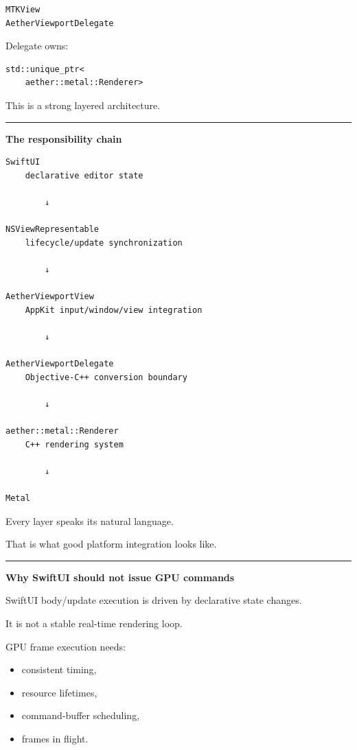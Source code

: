 \begin{verbatim}
MTKView
AetherViewportDelegate
\end{verbatim}

Delegate owns:

\begin{verbatim}
std::unique_ptr<
    aether::metal::Renderer>
\end{verbatim}

This is a strong layered architecture.

\begin{center}\rule{0.5\linewidth}{0.5pt}\end{center}

\textbf{The responsibility chain}

\begin{verbatim}
SwiftUI
    declarative editor state

        ↓

NSViewRepresentable
    lifecycle/update synchronization

        ↓

AetherViewportView
    AppKit input/window/view integration

        ↓

AetherViewportDelegate
    Objective-C++ conversion boundary

        ↓

aether::metal::Renderer
    C++ rendering system

        ↓

Metal
\end{verbatim}

Every layer speaks its natural language.

That is what good platform integration looks like.

\begin{center}\rule{0.5\linewidth}{0.5pt}\end{center}

\textbf{Why SwiftUI should not issue GPU commands}

SwiftUI body/update execution is driven by declarative state changes.

It is not a stable real-time rendering loop.

GPU frame execution needs:

\begin{itemize}
\tightlist
\item
  consistent timing,
\item
  resource lifetimes,
\item
  command-buffer scheduling,
\item
  frames in flight.
\end{itemize}

